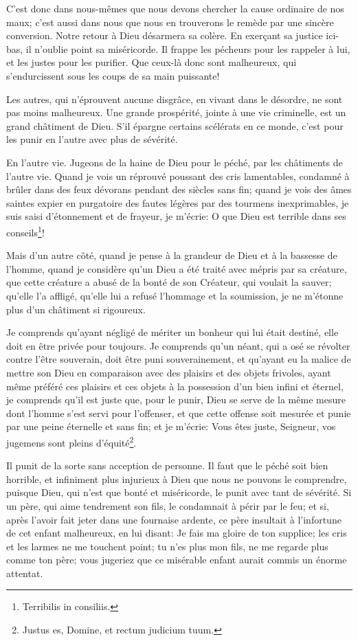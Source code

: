 \documentclass[instructions.tex]{subfiles}
\begin{document}
C'est donc dans nous-mêmes que nous devons chercher la cause ordinaire de nos maux; c'est aussi dans nous que nous en trouverons le remède par une sincère conversion. Notre retour à Dieu désarmera sa colère. En exerçant sa justice ici-bas, il n'oublie point sa miséricorde. Il frappe les pécheurs pour les rappeler à lui, et les justes pour les purifier. Que ceux-là donc sont malheureux, qui s'endurcissent sous les coups de sa main puissante!

Les autres, qui n'éprouvent aucune disgrâce, en vivant dans le désordre, ne sont pas moins malheureux. Une grande prospérité, jointe à une vie criminelle, est un grand châtiment de Dieu. S'il épargne certains scélérats en ce monde, c'est pour les punir en l'autre avec plus de sévérité.

\secundo En l'autre vie. Jugeons de la haine de Dieu pour le péché, par les châtiments de l'autre vie. Quand je vois un réprouvé poussant des cris lamentables, condamné à brûler dans des feux dévorans pendant des siècles sans fin; quand je vois des âmes saintes expier en purgatoire des fautes légères par des tourmens inexprimables, je suis saisi d'étonnement et de frayeur, je m'écrie: O que Dieu est terrible dans ses conseils\footnote{Terribilis in consiliis.}!

Mais d'un autre côté, quand je pense à la grandeur de Dieu et à la bassesse de l'homme, quand je considère qu'un Dieu a été traité avec mépris par sa créature, que cette créature a abusé de la bonté de son Créateur, qui voulait la sauver; qu'elle l'a affligé, qu'elle lui a refusé l'hommage et la soumission, je ne m'étonne plus d'un châtiment si rigoureux.

Je comprends qu'ayant négligé de mériter un bonheur qui lui était destiné, elle doit en être privée pour toujours. Je comprends qu'un néant, qui a osé se révolter contre l'être souverain, doit être puni souverainement, et qu'ayant eu la malice de mettre son Dieu en comparaison avec des plaisirs et des objets frivoles, ayant même préféré ces plaisirs et ces objets à la possession d'un bien infini et éternel, je comprends qu'il est juste que, pour le punir, Dieu se serve de la même mesure dont l'homme s'est servi pour l'offenser, et que cette offense soit mesurée et punie par une peine éternelle et sans fin; et je m'écrie: Vous êtes juste, Seigneur, vos jugemens sont pleins d'équité\footnote{Justus es, Domine, et rectum judicium tuum.}.

\tertio Il punit de la sorte sans acception de personne. Il faut que le péché soit bien horrible, et infiniment plus injurieux à Dieu que nous ne pouvons le comprendre, puisque Dieu, qui n'est que bonté et miséricorde, le punit avec tant de sévérité. Si un père, qui aime tendrement son fils, le condamnait à périr par le feu; et si, après l'avoir fait jeter dans une fournaise ardente, ce père insultait à l'infortune de cet enfant malheureux, en lui disant: Je fais ma gloire de ton supplice; les cris et les larmes ne me touchent point; tu n'es plus mon fils, ne me regarde plus comme ton père; vous jugeriez que ce misérable enfant aurait commis un énorme attentat.
\end{document}
